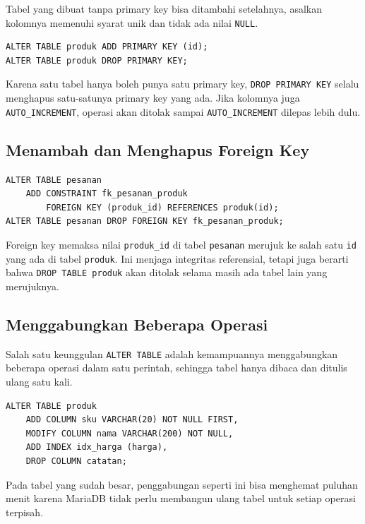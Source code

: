 \documentclass[11pt,a4paper]{article}
\begin{document}
Tabel yang dibuat tanpa primary key bisa ditambahi setelahnya, asalkan kolomnya memenuhi syarat unik dan tidak ada nilai \texttt{NULL}.

\begin{lstlisting}[style=code]
ALTER TABLE produk ADD PRIMARY KEY (id);
ALTER TABLE produk DROP PRIMARY KEY;
\end{lstlisting}

Karena satu tabel hanya boleh punya satu primary key, \texttt{DROP PRIMARY KEY} selalu menghapus satu-satunya primary key yang ada. Jika kolomnya juga \texttt{AUTO\_INCREMENT}, operasi akan ditolak sampai \texttt{AUTO\_INCREMENT} dilepas lebih dulu.

\subsection{Menambah dan Menghapus Foreign Key}

\begin{lstlisting}[style=code]
ALTER TABLE pesanan
    ADD CONSTRAINT fk_pesanan_produk
        FOREIGN KEY (produk_id) REFERENCES produk(id);
ALTER TABLE pesanan DROP FOREIGN KEY fk_pesanan_produk;
\end{lstlisting}

Foreign key memaksa nilai \texttt{produk\_id} di tabel \texttt{pesanan} merujuk ke salah satu \texttt{id} yang ada di tabel \texttt{produk}. Ini menjaga integritas referensial, tetapi juga berarti bahwa \texttt{DROP TABLE produk} akan ditolak selama masih ada tabel lain yang merujuknya.

\subsection{Menggabungkan Beberapa Operasi}

Salah satu keunggulan \texttt{ALTER TABLE} adalah kemampuannya menggabungkan beberapa operasi dalam satu perintah, sehingga tabel hanya dibaca dan ditulis ulang satu kali.

\begin{lstlisting}[style=code]
ALTER TABLE produk
    ADD COLUMN sku VARCHAR(20) NOT NULL FIRST,
    MODIFY COLUMN nama VARCHAR(200) NOT NULL,
    ADD INDEX idx_harga (harga),
    DROP COLUMN catatan;
\end{lstlisting}

Pada tabel yang sudah besar, penggabungan seperti ini bisa menghemat puluhan menit karena MariaDB tidak perlu membangun ulang tabel untuk setiap operasi terpisah.
\end{document}
